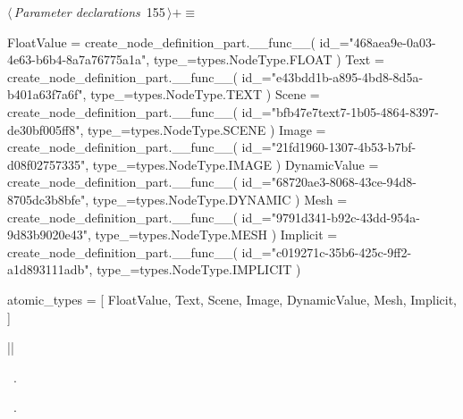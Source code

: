\documentclass[%
    a4paper,    %
    justified,  %
    nobib,      %
    openany     %
]{tufte-book}
\begin{document}
\begin{flushleft} \small
\begin{minipage}{\linewidth}\label{scrap180}\raggedright\small
{} $\langle\,${\itshape Parameter declarations}\nobreak\ {\footnotesize {155}}$\,\rangle+\equiv$
\vspace{-1ex}
\begin{pythoncode}
    FloatValue = create_node_definition_part.__func__(
        id_="468aea9e-0a03-4e63-b6b4-8a7a76775a1a",
        type_=types.NodeType.FLOAT
    )
    Text = create_node_definition_part.__func__(
        id_="e43bdd1b-a895-4bd8-8d5a-b401a63f7a6f",
        type_=types.NodeType.TEXT
    )
    Scene = create_node_definition_part.__func__(
        id_="bfb47e7text7-1b05-4864-8397-de30bf005ff8",
        type_=types.NodeType.SCENE
    )
    Image = create_node_definition_part.__func__(
        id_="21fd1960-1307-4b53-b7bf-d08f02757335",
        type_=types.NodeType.IMAGE
    )
    DynamicValue = create_node_definition_part.__func__(
        id_="68720ae3-8068-43ce-94d8-8705dc3b8bfe",
        type_=types.NodeType.DYNAMIC
    )
    Mesh = create_node_definition_part.__func__(
        id_="9791d341-b92c-43dd-954a-9d83b9020e43",
        type_=types.NodeType.MESH
    )
    Implicit = create_node_definition_part.__func__(
        id_="c019271c-35b6-425c-9ff2-a1d893111adb",
        type_=types.NodeType.IMPLICIT
    )

    atomic_types = [
        FloatValue,
        Text,
        Scene,
        Image,
        DynamicValue,
        Mesh,
        Implicit,
    ]

|\NWsep|
\end{pythoncode}
\vspace{1.5ex}
\footnotesize
\begin{list}{}{\setlength{\itemsep}{-\parsep}\setlength{\itemindent}{-\leftmargin}}
\item \NWtxtMacroDefBy\ .
\item \NWtxtMacroRefIn\ .

\item{}
\end{list}
\end{minipage}\vspace{4ex}
\end{flushleft}
\end{document}
